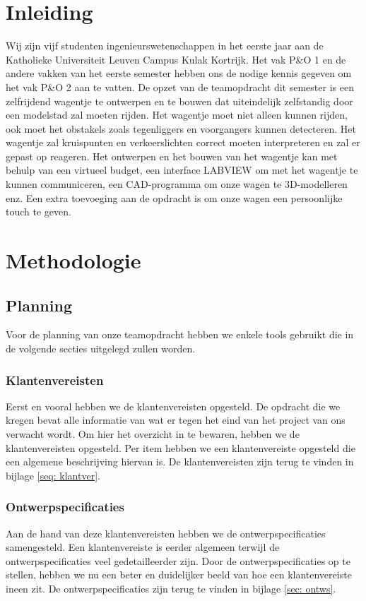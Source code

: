 \documentclass[a4paper,twoside,kulak]{kulakreport}
\begin{document}
	
	\chapter*{Inleiding}

Wij zijn vijf studenten ingenieurswetenschappen in het eerste jaar aan de Katholieke Universiteit Leuven Campus Kulak Kortrijk.
Het vak P\&O 1 en de andere vakken van het eerste semester hebben ons de nodige kennis gegeven om het vak P\&O 2 aan te vatten. 
De opzet van de teamopdracht dit semester is een zelfrijdend wagentje te ontwerpen en te bouwen dat uiteindelijk zelfstandig door een modelstad zal moeten rijden. Het wagentje moet niet alleen kunnen rijden, ook moet het obstakels zoals tegenliggers en voorgangers kunnen detecteren. Het wagentje zal kruispunten en verkeerslichten correct moeten  interpreteren en zal er gepast op reageren. Het ontwerpen en het bouwen van het wagentje kan met behulp van een virtueel budget, een interface LABVIEW om met het wagentje te kunnen communiceren, een CAD-programma om onze wagen te 3D-modelleren enz. 
Een extra toevoeging aan de opdracht is om onze wagen een persoonlijke touch te geven. 
	
	\chapter{Methodologie}
	
	
	
	\section{Planning}
	
	Voor de planning van onze teamopdracht hebben we enkele tools gebruikt die in de volgende secties uitgelegd zullen worden. 
	\subsection*{Klantenvereisten}
	Eerst en vooral hebben we de klantenvereisten opgesteld. De opdracht die we kregen bevat alle informatie van wat er tegen het eind van het project van ons verwacht wordt. Om hier het overzicht in te bewaren, hebben we de klantenvereisten opgesteld. Per item hebben we een klantenvereiste opgesteld die een algemene beschrijving hiervan is. De klantenvereisten zijn terug te vinden in bijlage \ref{seq: klantver}. 
	
	\subsection*{Ontwerpspecificaties}Aan de hand van deze klantenvereisten hebben we de ontwerpspecificaties samengesteld. Een klantenvereiste is eerder algemeen terwijl de ontwerpspecificaties veel gedetailleerder zijn. Door de ontwerpspecificaties op te stellen, hebben we nu een beter en duidelijker beeld van hoe een klantenvereiste ineen zit. De ontwerpspecificaties zijn terug te vinden in bijlage \ref{sec: ontws}. 
	
\end{document}
